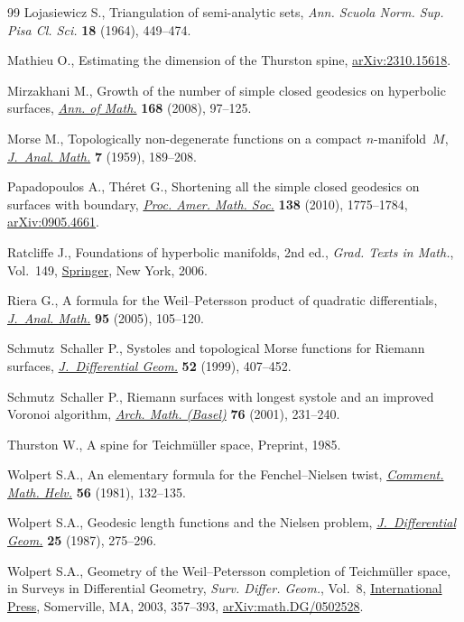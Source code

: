 \documentclass[pdftex]{sigma}
\numberwithin{equation}{section}
\begin{document}
\begin{thebibliography}{99}
Lojasiewicz S., Triangulation of semi-analytic sets, \textit{Ann. Scuola Norm.
 Sup. Pisa Cl. Sci.} \textbf{18} (1964), 449--474.

Mathieu O., Estimating the dimension of the {T}hurston spine,
 \href{https://arxiv.org/abs/2310.15618}{arXiv:2310.15618}.

Mirzakhani M., Growth of the number of simple closed geodesics on hyperbolic
 surfaces, \href{https://doi.org/10.4007/annals.2008.168.97}{\textit{Ann. of Math.}} \textbf{168} (2008), 97--125.

Morse M., Topologically non-degenerate functions on a compact
 {$n$}-manifold~{$M$}, \href{https://doi.org/10.1007/BF02787685}{\textit{J.~Anal. Math.}} \textbf{7} (1959), 189--208.

Papadopoulos A., Th\'eret G., Shortening all the simple closed geodesics on
 surfaces with boundary, \href{https://doi.org/10.1090/S0002-9939-09-10195-8}{\textit{Proc. Amer. Math. Soc.}} \textbf{138} (2010),
 1775--1784, \href{https://arxiv.org/abs/0905.4661}{arXiv:0905.4661}.

Ratcliffe J., Foundations of hyperbolic manifolds, 2nd ed., \textit{Grad. Texts in
 Math.}, Vol.~149, \href{https://doi.org/10.1007/978-0-387-47322-2}{Springer}, New York, 2006.

Riera G., A formula for the {W}eil--{P}etersson product of quadratic
 differentials, \href{https://doi.org/10.1007/BF02791498}{\textit{J.~Anal. Math.}} \textbf{95} (2005), 105--120.

Schmutz~Schaller P., Systoles and topological {M}orse functions for {R}iemann
 surfaces, \href{https://doi.org/10.4310/jdg/1214425347}{\textit{J.~Differential Geom.}} \textbf{52} (1999), 407--452.

Schmutz~Schaller P., Riemann surfaces with longest systole and an improved
 {V}oronoi algorithm, \href{https://doi.org/10.1007/s000130050564}{\textit{Arch. Math. (Basel)}} \textbf{76} (2001),
 231--240.

Thurston W., A spine for {T}eichm\"uller space, {P}reprint, 1985.

Wolpert S.A., An elementary formula for the {F}enchel--{N}ielsen twist,
 \href{https://doi.org/10.1007/BF02566203}{\textit{Comment. Math. Helv.}} \textbf{56} (1981), 132--135.

Wolpert S.A., Geodesic length functions and the {N}ielsen problem,
 \href{https://doi.org/10.4310/jdg/1214440853}{\textit{J.~Differential Geom.}} \textbf{25} (1987), 275--296.

Wolpert S.A., Geometry of the {W}eil--{P}etersson completion of {T}eichm\"uller
 space, in Surveys in {D}ifferential {G}eometry, \textit{Surv. Differ. Geom.},
 Vol.~8, \href{https://doi.org/10.4310/SDG.2003.v8.n1.a13}{International Press}, Somerville, MA, 2003, 357--393,
 \href{https://arxiv.org/abs/math.DG/0502528}{arXiv:math.DG/0502528}.

\end{thebibliography}\LastPageEnding
\end{document}
